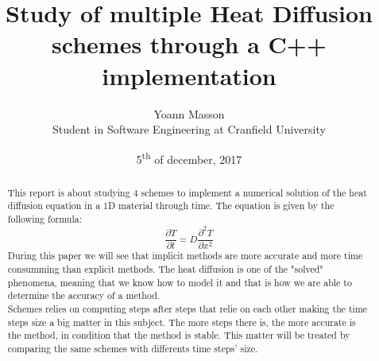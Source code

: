 \documentclass[12pt, a4paper]{report}
\title{Study of multiple Heat Diffusion schemes through a C++ implementation}
\author{Yoann Masson \\ Student in Software Engineering at Cranfield University}
\date{5\textsuperscript{th} of december, 2017}
\begin{document}
\begin{titlepage}
\maketitle
\end{titlepage}


\begin{abstract}
This report is about studying 4 schemes to implement a numerical solution of the heat diffusion equation in a 1D material through time. The equation is given by the following formula: \begin{equation}\frac{\partial T}{\partial t} = D\frac{\partial^2T }{\partial x^2}
\end{equation} 
During this paper we will see that implicit methods are more accurate and more time consumming than explicit methods. The heat diffusion is one of the "solved" phenomena, meaning that we know how to model it and that is how we are able to determine the accuracy of a method. \\
Schemes relies on computing steps after steps that relie on each other making the time steps size a big matter in this subject. The more steps there is, the more accurate is the method, in condition that the method is stable. This matter will be treated by comparing the same schemes with differents time steps' size.


\end{abstract}


\tableofcontents
\end{document}
